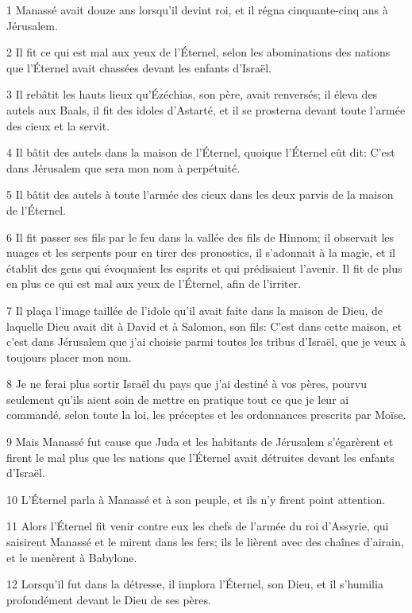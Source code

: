 \par 1 Manassé avait douze ans lorsqu'il devint roi, et il régna cinquante-cinq ans à Jérusalem.
\par 2 Il fit ce qui est mal aux yeux de l'Éternel, selon les abominations des nations que l'Éternel avait chassées devant les enfants d'Israël.
\par 3 Il rebâtit les hauts lieux qu'Ézéchias, son père, avait renversés; il éleva des autels aux Baals, il fit des idoles d'Astarté, et il se prosterna devant toute l'armée des cieux et la servit.
\par 4 Il bâtit des autels dans la maison de l'Éternel, quoique l'Éternel eût dit: C'est dans Jérusalem que sera mon nom à perpétuité.
\par 5 Il bâtit des autels à toute l'armée des cieux dans les deux parvis de la maison de l'Éternel.
\par 6 Il fit passer ses fils par le feu dans la vallée des fils de Hinnom; il observait les nuages et les serpents pour en tirer des pronostics, il s'adonnait à la magie, et il établit des gens qui évoquaient les esprits et qui prédisaient l'avenir. Il fit de plus en plus ce qui est mal aux yeux de l'Éternel, afin de l'irriter.
\par 7 Il plaça l'image taillée de l'idole qu'il avait faite dans la maison de Dieu, de laquelle Dieu avait dit à David et à Salomon, son fils: C'est dans cette maison, et c'est dans Jérusalem que j'ai choisie parmi toutes les tribus d'Israël, que je veux à toujours placer mon nom.
\par 8 Je ne ferai plus sortir Israël du pays que j'ai destiné à vos pères, pourvu seulement qu'ils aient soin de mettre en pratique tout ce que je leur ai commandé, selon toute la loi, les préceptes et les ordonnances prescrits par Moïse.
\par 9 Mais Manassé fut cause que Juda et les habitants de Jérusalem s'égarèrent et firent le mal plus que les nations que l'Éternel avait détruites devant les enfants d'Israël.
\par 10 L'Éternel parla à Manassé et à son peuple, et ils n'y firent point attention.
\par 11 Alors l'Éternel fit venir contre eux les chefs de l'armée du roi d'Assyrie, qui saisirent Manassé et le mirent dans les fers; ils le lièrent avec des chaînes d'airain, et le menèrent à Babylone.
\par 12 Lorsqu'il fut dans la détresse, il implora l'Éternel, son Dieu, et il s'humilia profondément devant le Dieu de ses pères.
